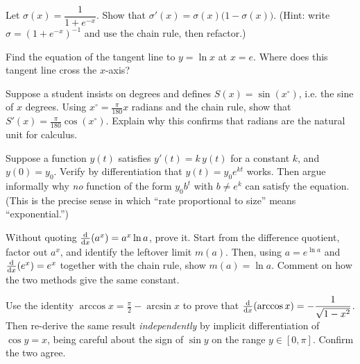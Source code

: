 \begin{exercise}
\label{ch12:exr-sigmoid}
Let $\sigma(x) = \dfrac{1}{1+e^{-x}}$. Show that
$\sigma'(x) = \sigma(x)\big(1-\sigma(x)\big)$. (Hint: write
$\sigma = (1+e^{-x})^{-1}$ and use the chain rule, then refactor.)
\end{exercise}

\begin{exercise}
\label{ch12:exr-tangent}
Find the equation of the tangent line to $y=\ln x$ at $x=e$. Where does this
tangent line cross the $x$-axis?
\end{exercise}

\begin{exercise}
\label{ch12:exr-radian}
Suppose a student insists on degrees and defines $S(x)=\sin(x^\circ)$, i.e.
the sine of $x$ degrees. Using $x^\circ = \tfrac{\pi}{180}x$ radians and the
chain rule, show that $S'(x) = \tfrac{\pi}{180}\cos(x^\circ)$. Explain why
this confirms that radians are the natural unit for calculus.
\end{exercise}

\begin{exercise}
\label{ch12:exr-proportional}
Suppose a function $y(t)$ satisfies $y'(t) = k\,y(t)$ for a constant $k$, and
$y(0)=y_0$. Verify by differentiation that $y(t) = y_0 e^{kt}$ works. Then
argue informally why \emph{no} function of the form $y_0 b^t$ with
$b\ne e^k$ can satisfy the equation. (This is the precise sense in which
``rate proportional to size'' means ``exponential.'')
\end{exercise}

\begin{exercise}
\label{ch12:exr-proof-ax}
Without quoting $\frac{\mathrm{d}}{\mathrm{d} x}\!\left(a^x\right)=a^x\ln a$, prove it. Start from the difference
quotient, factor out $a^x$, and identify the leftover limit $m(a)$. Then,
using $a = e^{\ln a}$ and $\frac{\mathrm{d}}{\mathrm{d} x}\!\left(e^x\right)=e^x$ together with the chain rule, show
$m(a)=\ln a$. Comment on how the two methods give the same constant.
\end{exercise}

\begin{exercise}
\label{ch12:exr-proof-arccos}
Use the identity $\arccos x = \tfrac{\pi}{2} - \arcsin x$ to prove that
$\frac{\mathrm{d}}{\mathrm{d} x}\!\left(\arccos x\right) = -\dfrac{1}{\sqrt{1-x^2}}$. Then re-derive the same result
\emph{independently} by implicit differentiation of $\cos y = x$, being
careful about the sign of $\sin y$ on the range $y\in[0,\pi]$. Confirm the
two agree.
\end{exercise}

